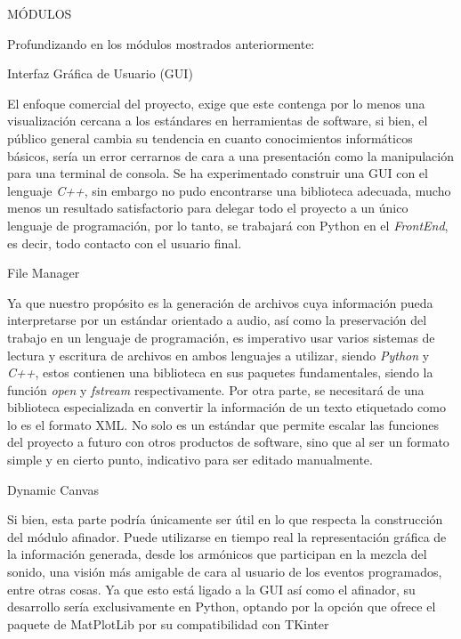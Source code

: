 \documentclass{book}
\begin{document}
	\pagebreak
	\begin{minipage}{.7\textwidth}
		\begin{flushleft}
			\vspace{10pt}
			\begin{center}
				\Large{MÓDULOS}
				\hrulefill\\[1.5cm]
			\end{center}
		\end{flushleft}
	\end{minipage}\par
	Profundizando en los módulos mostrados anteriormente:\par
	{\Large Interfaz Gráfica de Usuario (GUI)}\par
	El enfoque comercial del proyecto, exige que este contenga por lo menos una visualización cercana a los estándares en herramientas de software, si bien, el público general cambia su tendencia en cuanto conocimientos informáticos básicos, sería un error cerrarnos de cara a una presentación como la manipulación para una terminal de consola. Se ha experimentado construir una GUI con el lenguaje \emph{C++}, sin embargo no pudo encontrarse una biblioteca adecuada, mucho menos un resultado satisfactorio para delegar todo el proyecto a un único lenguaje de programación, por lo tanto, se trabajará con Python en el \emph{FrontEnd}, es decir, todo contacto con el usuario final.\par
	{\large File Manager}\par
	Ya que nuestro propósito es la generación de archivos cuya información pueda interpretarse por un estándar orientado a audio, así como la preservación del trabajo en un lenguaje de programación, es imperativo usar varios sistemas de lectura y escritura de archivos en ambos lenguajes a utilizar, siendo \emph{Python} y \emph{C++}, estos contienen una biblioteca en sus paquetes fundamentales, siendo la función \emph{open} y \emph{fstream} respectivamente. Por otra parte, se necesitará de una biblioteca especializada en convertir la información de un texto etiquetado como lo es el formato XML. No solo es un estándar que permite escalar las funciones del proyecto a futuro con otros productos de software, sino que al ser un formato simple y en cierto punto, indicativo para ser editado manualmente.\par
	{\large Dynamic Canvas}\par
	Si bien, esta parte podría únicamente ser útil en lo que respecta la construcción del módulo afinador. Puede utilizarse en tiempo real la representación gráfica de la información generada, desde los armónicos que participan en la mezcla del sonido, una visión más amigable de cara al usuario de los eventos programados, entre otras cosas. Ya que esto está ligado a la GUI así como el afinador, su desarrollo sería exclusivamente en Python, optando por la opción que ofrece el paquete de MatPlotLib por su compatibilidad con TKinter\par
\end{document}
